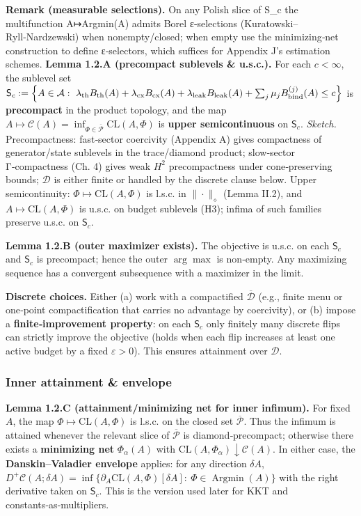 \documentclass[
]{article}
\numberwithin{equation}{section}
\begin{document}
\textbf{Remark (measurable selections).} On any Polish slice of S\_c the
multifunction A↦Argmin(A) admits Borel ε‑selections
(Kuratowski--Ryll‑Nardzewski) when nonempty/closed; when empty use the
minimizing‑net construction to define ε‑selectors, which suffices for
Appendix J's estimation schemes. \textbf{Lemma 1.2.A (precompact
sublevels \& u.s.c.).} For each \(c<\infty\), the sublevel set
\(\mathsf S_c:=\Big\{A\in\mathcal A:\ \lambda_{\rm th} B_{\rm th}(A)+\lambda_{\rm cx} B_{\rm cx}(A)+\lambda_{\rm leak} B_{\rm leak}(A)+\textstyle\sum_j\mu_j B_{\rm bind}^{(j)}(A)\le c\Big\}\)
is \textbf{precompact} in the product topology, and the map
\(A\mapsto \mathcal C(A)=\inf_{\Phi\in\overline{\mathcal P}}\mathrm{CL}(A,\Phi)\)
is \textbf{upper semicontinuous} on \(\mathsf S_c\). \emph{Sketch.}
Precompactness: fast‑sector coercivity (Appendix A) gives compactness of
generator/state sublevels in the trace/diamond product; slow‑sector
Γ‑compactness (Ch. 4) gives weak \(H^2\) precompactness under
cone‑preserving bounds; \(\mathcal D\) is either finite or handled by
the discrete clause below. Upper semicontinuity:
\(\Phi\mapsto\mathrm{CL}(A,\Phi)\) is l.s.c. in \(\|\cdot\|_\diamond\)
(Lemma II.2), and \(A\mapsto\mathrm{CL}(A,\Phi)\) is u.s.c. on budget
sublevels (H3); infima of such families preserve u.s.c. on
\(\mathsf S_c\).

\textbf{Lemma 1.2.B (outer maximizer exists).} The objective is u.s.c.
on each \(\mathsf S_c\) and \(\mathsf S_c\) is precompact; hence the
outer \(\arg\max\) is non‑empty. Any maximizing sequence has a
convergent subsequence with a maximizer in the limit.

\textbf{Discrete choices.} Either (a) work with a compactified
\(\overline{\mathcal D}\) (e.g., finite menu or one‑point
compactification that carries no advantage by coercivity), or (b) impose
a \textbf{finite‑improvement property}: on each \(\mathsf S_c\) only
finitely many discrete flips can strictly improve the objective (holds
when each flip increases at least one active budget by a fixed
\(\varepsilon>0\)). This ensures attainment over \(\mathcal D\).

\hypertarget{inner-attainment-envelope}{%
\subsubsection{Inner attainment \&
envelope}\label{inner-attainment-envelope}}

\textbf{Lemma 1.2.C (attainment/minimizing net for inner infimum).} For
fixed \(A\), the map \(\Phi\mapsto \mathrm{CL}(A,\Phi)\) is l.s.c. on
the closed set \(\overline{\mathcal P}\). Thus the infimum is attained
whenever the relevant slice of \(\overline{\mathcal P}\) is
diamond‑precompact; otherwise there exists a \textbf{minimizing net}
\(\Phi_\alpha(A)\) with
\(\mathrm{CL}(A,\Phi_\alpha)\downarrow \mathcal C(A)\). In either case,
the \textbf{Danskin--Valadier envelope} applies: for any direction
\(\delta A\),
\(D^+\mathcal C(A;\delta A)=\inf\{\partial_A\mathrm{CL}(A,\Phi)[\delta A]:\ \Phi\in \operatorname{Argmin}(A)\}\)
with the right derivative taken on \(\mathsf S_c\). This is the version
used later for KKT and constants‑as‑multipliers.
\end{document}
